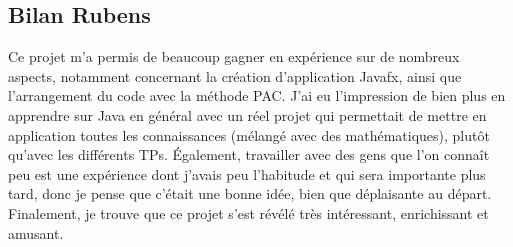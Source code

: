 \subsection{Bilan Rubens}

Ce projet m’a permis de beaucoup gagner en expérience sur de nombreux aspects, notamment concernant la création d’application Javafx, ainsi que l’arrangement du code avec la méthode PAC. J’ai eu l’impression de bien plus en apprendre sur Java en général avec un réel projet qui permettait de mettre en application toutes les connaissances (mélangé avec des mathématiques), plutôt qu’avec les différents TPs. Également, travailler avec des gens que l’on connaît peu est une expérience dont j’avais peu l’habitude et qui sera importante plus tard, donc je pense que c’était une bonne idée, bien que déplaisante au départ. 
Finalement, je trouve que ce projet s’est révélé très intéressant, enrichissant et amusant.